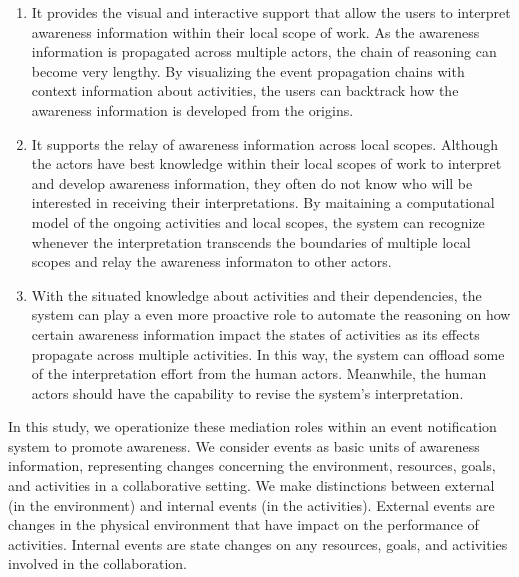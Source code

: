 \begin{enumerate}
	\item It provides the visual and interactive support that allow the users to interpret awareness information within their local scope of work. As the awareness information is propagated across multiple actors, the chain of reasoning can become very lengthy. By visualizing the event propagation chains with context information about activities, the users can backtrack how the awareness information is developed from the origins.
	
	\item It supports the relay of awareness information across local scopes. Although the actors have best knowledge within their local scopes of work to interpret and develop awareness information,  they often do not know who will be interested in receiving their interpretations. By maitaining a computational model of the ongoing activities and local scopes, the system can recognize whenever the interpretation transcends the boundaries of multiple local scopes and relay the awareness informaton to other actors.
	
	\item With the situated knowledge about activities and their dependencies, the system can play a even more proactive role to automate the reasoning on how certain awareness information impact the states of activities as its effects propagate across multiple activities. In this way, the system can offload some of the interpretation effort from the human actors. Meanwhile, the human actors should have the capability to revise the system’s interpretation.
	
\end{enumerate}

In this study, we operationize these mediation roles within an event notification system to promote awareness. We consider events as basic units of awareness information, representing changes concerning the environment, resources, goals, and activities in a collaborative setting. We make distinctions between external (in the environment) and internal events (in the activities). External events are changes in the physical environment that have impact on the performance of activities. Internal events are state changes on any resources, goals, and activities involved in the collaboration.

